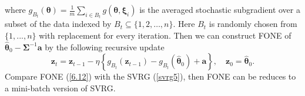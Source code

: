 \documentclass[12pt]{article}
\numberwithin{equation}{section}
\begin{document}
where $g_{B_{t}}(\boldsymbol{\theta})=\frac{1}{m} \sum_{i \in B_{t}} g\left(\boldsymbol{\theta}, \boldsymbol{\xi}_{i}\right)$ is the averaged stochastic subgradient over a subset of the data indexed by $B_{t} \subseteq\{1,2, \ldots, n\}$. Here $B_t$ is randomly chosen from $\{1, ...,n\}$ with replacement for every iteration. Then we can construct FONE of  $\widehat{\boldsymbol{\theta}}_{0}-\boldsymbol{\Sigma}^{-1} \boldsymbol{a}$ by the following recursive update
\begin{equation}\label{6.12}
\boldsymbol{z}_{t}=\boldsymbol{z}_{t-1}-\eta\left\{g_{B_{t}}\left(\boldsymbol{z}_{t-1}\right)-g_{B_{t}}\left(\widehat{\boldsymbol{\theta}}_{0}\right)+\boldsymbol{a}\right\}, \quad \boldsymbol{z}_{0}=\widehat{\boldsymbol{\theta}}_{0}.
\end{equation}
Compare FONE (\ref{6.12}) with the SVRG (\ref{svrg5}), then FONE can be reduces to a mini-batch version of SVRG.

\end{document}
